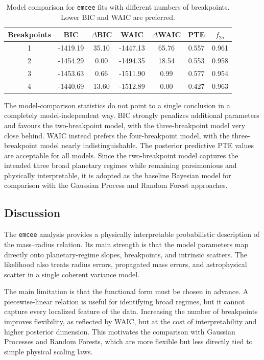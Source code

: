 \documentclass{article}
\numberwithin{equation}{section}
\begin{document}
\begin{table}[H]
\centering
\caption{Model comparison for \texttt{emcee} fits with different numbers of breakpoints. Lower BIC and WAIC are preferred.}
\label{tab:emcee-model-comparison}
\begin{tabular}{ccccccc}
\toprule
Breakpoints & BIC & $\Delta$BIC & WAIC & $\Delta$WAIC & PTE & $f_{2\sigma}$ \\
\midrule
1 & -1419.19 & 35.10 & -1447.13 & 65.76 & 0.557 & 0.961 \\
2 & -1454.29 & 0.00 & -1494.35 & 18.54 & 0.553 & 0.958 \\
3 & -1453.63 & 0.66 & -1511.90 & 0.99 & 0.577 & 0.954 \\
4 & -1440.69 & 13.60 & -1512.89 & 0.00 & 0.427 & 0.963 \\
\bottomrule
\end{tabular}
\end{table}

The model-comparison statistics do not point to a single conclusion in a completely model-independent way. BIC strongly penalizes additional parameters and favours the two-breakpoint model, with the three-breakpoint model very close behind. WAIC instead prefers the four-breakpoint model, with the three-breakpoint model nearly indistinguishable. The posterior predictive PTE values are acceptable for all models. Since the two-breakpoint model captures the intended three broad planetary regimes while remaining parsimonious and physically interpretable, it is adopted as the baseline Bayesian model for comparison with the Gaussian Process and Random Forest approaches.

\subsection{Discussion}

The \texttt{emcee} analysis provides a physically interpretable probabilistic description of the mass--radius relation. Its main strength is that the model parameters map directly onto planetary-regime slopes, breakpoints, and intrinsic scatters. The likelihood also treats radius errors, propagated mass errors, and astrophysical scatter in a single coherent variance model.

The main limitation is that the functional form must be chosen in advance. A piecewise-linear relation is useful for identifying broad regimes, but it cannot capture every localized feature of the data. Increasing the number of breakpoints improves flexibility, as reflected by WAIC, but at the cost of interpretability and higher posterior dimension. This motivates the comparison with Gaussian Processes and Random Forests, which are more flexible but less directly tied to simple physical scaling laws.
\end{document}
